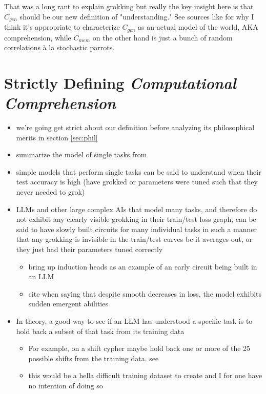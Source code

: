 \documentclass{article}
\begin{document}
That was a long rant to explain grokking but really the key insight here is that $C_{gen}$ should be our new definition of "understanding."
See sources like \cite{tegmark2023spacetime} for why I think it's appropriate to characterize $C_{gen}$ as an actual model of the world, AKA comprehension, while $C_{mem}$ on the other hand is just a bunch of random correlations \`a la stochastic parrots.







\section{Strictly Defining \textit{Computational Comprehension}}
\label{sec:def}

\begin{itemize}
    \item we're going get strict about our definition before analyzing its philosophical merits in section \ref{sec:phil} 
    \item summarize the model of single tasks from \cite{arora2023skills}
    \item simple models that perform single tasks can be said to understand when their test accuracy is high (have grokked or parameters were tuned such that they never needed to grok)
    \item LLMs and other large complex AIs that model many tasks, and therefore do not exhibit any clearly visible grokking in their train/test loss graph, can be said to have slowly built circuits for many individual tasks in such a manner that any grokking is invisible in the train/test curves bc it averages out, or they just had their parameters tuned correctly
    \begin{itemize}
        \item bring up induction heads \cite{olsson2022context} as an example of an early circuit being built in an LLM
        \item cite \cite{brown2020language} when saying that despite smooth decreases in loss, the model exhibits sudden emergent abilities
    \end{itemize}
    \item In theory, a good way to see if an LLM has understood a specific task is to hold back a subset of that task from its training data
    \begin{itemize}
        \item For example, on a shift cypher maybe hold back one or more of the 25 possible shifts from the training data. see \cite{mccoy2023embers}
        \item this would be a hella difficult training dataset to create and I for one have no intention of doing so
    \end{itemize}
\end{itemize}
\end{document}
